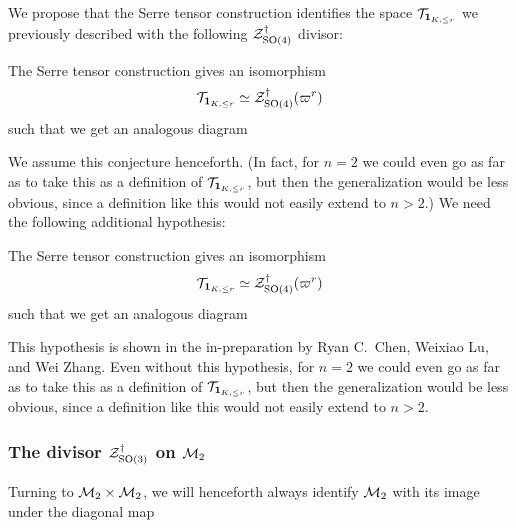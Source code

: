 \ifthesis
We propose that the Serre tensor construction identifies
the space $\mathcal{T}_{\mathbf{1}_{K, \le r}}$ we previously described with the following $\mathcal Z^{\dagger}_{\operatorname{SO}(4)}$ divisor:
\begin{conjecture}
  \label{hypo:serre_pullback_space}
  The Serre tensor construction gives an isomorphism
  \[ \mathcal{T}_{\mathbf{1}_{K, \le r}} \simeq \mathcal Z^{\dagger}_{\operatorname{SO}(4)}(\varpi^r) \]
  such that we get an analogous diagram
  \begin{center}
  \end{center}
\end{conjecture}
We assume this conjecture henceforth.
(In fact, for $n = 2$ we could even go as far as to take this as a definition of $\mathcal{T}_{\mathbf{1}_{K, \le r}}$,
but then the generalization  would be less obvious,
since a definition like this would not easily extend to $n > 2$.)
\fi
\ifpaper
We need the following additional hypothesis:
\begin{hypothesis}
  \label{hypo:serre_pullback_space}
  The Serre tensor construction gives an isomorphism
  \[ \mathcal{T}_{\mathbf{1}_{K, \le r}} \simeq \mathcal Z^{\dagger}_{\operatorname{SO}(4)}(\varpi^r) \]
  such that we get an analogous diagram
  \begin{center}
  \end{center}
\end{hypothesis}
This hypothesis is shown in the in-preparation
\cite{ref:CLZ} by Ryan C.~Chen, Weixiao Lu, and Wei Zhang.
Even without this hypothesis,
for $n = 2$ we could even go as far as to take this as a definition of $\mathcal{T}_{\mathbf{1}_{K, \le r}}$,
but then the generalization  would be less obvious,
since a definition like this would not easily extend to $n > 2$.
\fi

\subsubsection{The divisor $\mathcal Z^{\dagger}_{\operatorname{SO}(3)}$ on $\mathcal M_2$}
Turning to $\mathcal M_2 \times \mathcal M_2$, we will henceforth always identify $\mathcal M_2$
with its image under the diagonal map
\begin{center}
\end{center}

